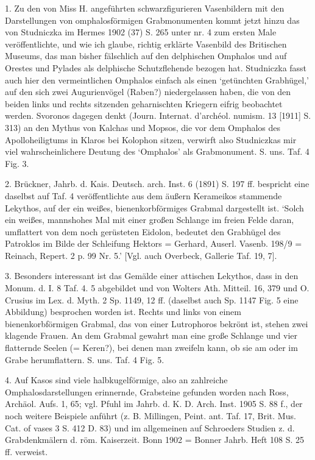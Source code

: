 \documentclass[a4paper, 11pt, oneside]{article}
\begin{document}
1. Zu den von Miss H. angeführten schwarzfigurieren Vasenbildern mit den Darstellungen von omphalosförmigen Grabmonumenten kommt jetzt hinzu das von Studniczka im Hermes 1902 (37) S. 265 unter nr. 4 zum ersten Male veröffentlichte, und wie ich glaube, richtig erklärte Vasenbild des Britischen Museums, das man bisher fälschlich auf den delphischen Omphalos und auf Orestes und Pylades als delphische Schutzflehende bezogen hat. Studniczka fasst auch hier den vermeintlichen Omphalos einfach als einen `getünchten Grabhügel,' auf den sich zwei Augurienvögel (Raben?) niedergelassen haben, die von den beiden links und rechts sitzenden geharnischten Kriegern eifrig beobachtet werden. Svoronos dagegen denkt (Journ. Internat. d'archéol. numism. 13 [1911] S. 313) an den Mythus von Kalchas und Mopsos, die vor dem Omphalos des Apolloheiligtums in Klaros bei Kolophon sitzen, verwirft also Studniczkas mir viel wahrscheinlichere Deutung des `Omphalos' als Grabmonument. S. uns. Taf. 4 Fig. 3.

2. Brückner, Jahrb. d. Kais. Deutsch. arch. Inst. 6 (1891) S. 197 ff. bespricht eine daselbst auf Taf. 4 veröffentlichte aus dem äußern Kerameikos stammende Lekythos, auf der ein weißes, bienenkorbförmiges Grabmal dargestellt ist. `Solch ein weißes, mannshohes Mal mit einer großen Schlange im freien Felde daran, umflattert von dem noch gerüsteten Eidolon, bedeutet den Grabhügel des Patroklos im Bilde der Schleifung Hektors = Gerhard, Auserl. Vasenb. 198/9 = Reinach, Repert. 2 p. 99 Nr. 5.' [Vgl. auch Overbeck, Gallerie Taf. 19, 7].

3. Besonders interessant ist das Gemälde einer attischen Lekythos, dass in den Monum. d. I. 8 Taf. 4. 5 abgebildet und von Wolters Ath. Mitteil. 16, 379 und O. Crusius im Lex. d. Myth. 2 Sp. 1149, 12 ff. (daselbst auch Sp. 1147 Fig. 5 eine Abbildung) besprochen worden ist. Rechts und links von einem bienenkorbförmigen Grabmal, das von einer Lutrophoros bekrönt ist, stehen zwei klagende Frauen. An dem Grabmal gewahrt man eine große Schlange und vier flatternde Seelen (= Keren?), bei denen man zweifeln kann, ob sie am oder im Grabe herumflattern. S. uns. Taf. 4 Fig. 5.

4. Auf Kasos sind viele halbkugelförmige, also an zahlreiche Omphalosdarstellungen erinnernde, Grabsteine gefunden worden nach Ross, Archäol. Aufs. 1, 65; vgl. Pfuhl im Jahrb. d. K. D. Arch. Inst. 1905 S. 88 f., der noch weitere Beispiele anführt (z. B. Millingen, Peint. ant. Taf. 17, Brit. Mus. Cat. of vases 3 S. 412 D. 83) und im allgemeinen auf Schroeders Studien z. d. Grabdenkmälern d. röm. Kaiserzeit. Bonn 1902 = Bonner Jahrb. Heft 108 S. 25 ff. verweist.
\end{document}
